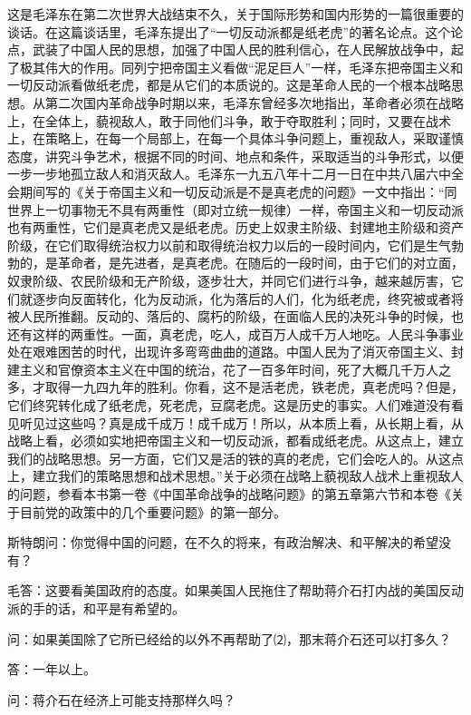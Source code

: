 \documentclass[UTF-8, a5paper, 12pt]{ctexart}
\begin{document}
这是毛泽东在第二次世界大战结束不久，关于国际形势和国内形势的一篇很重要的谈话。在这篇谈话里，毛泽东提出了“一切反动派都是纸老虎”的著名论点。这个论点，武装了中国人民的思想，加强了中国人民的胜利信心，在人民解放战争中，起了极其伟大的作用。同列宁把帝国主义看做“泥足巨人”一样，毛泽东把帝国主义和一切反动派看做纸老虎，都是从它们的本质说的。这是革命人民的一个根本战略思想。从第二次国内革命战争时期以来，毛泽东曾经多次地指出，革命者必须在战略上，在全体上，藐视敌人，敢于同他们斗争，敢于夺取胜利；同时，又要在战术上，在策略上，在每一个局部上，在每一个具体斗争问题上，重视敌人，采取谨慎态度，讲究斗争艺术，根据不同的时间、地点和条件，采取适当的斗争形式，以便一步一步地孤立敌人和消灭敌人。毛泽东一九五八年十二月一日在中共八届六中全会期间写的《关于帝国主义和一切反动派是不是真老虎的问题》一文中指出：“同世界上一切事物无不具有两重性（即对立统一规律）一样，帝国主义和一切反动派也有两重性，它们是真老虎又是纸老虎。历史上奴隶主阶级、封建地主阶级和资产阶级，在它们取得统治权力以前和取得统治权力以后的一段时间内，它们是生气勃勃的，是革命者，是先进者，是真老虎。在随后的一段时间，由于它们的对立面，奴隶阶级、农民阶级和无产阶级，逐步壮大，并同它们进行斗争，越来越厉害，它们就逐步向反面转化，化为反动派，化为落后的人们，化为纸老虎，终究被或者将被人民所推翻。反动的、落后的、腐朽的阶级，在面临人民的决死斗争的时候，也还有这样的两重性。一面，真老虎，吃人，成百万人成千万人地吃。人民斗争事业处在艰难困苦的时代，出现许多弯弯曲曲的道路。中国人民为了消灭帝国主义、封建主义和官僚资本主义在中国的统治，花了一百多年时间，死了大概几千万人之多，才取得一九四九年的胜利。你看，这不是活老虎，铁老虎，真老虎吗？但是，它们终究转化成了纸老虎，死老虎，豆腐老虎。这是历史的事实。人们难道没有看见听见过这些吗？真是成千成万！成千成万！所以，从本质上看，从长期上看，从战略上看，必须如实地把帝国主义和一切反动派，都看成纸老虎。从这点上，建立我们的战略思想。另一方面，它们又是活的铁的真的老虎，它们会吃人的。从这点上，建立我们的策略思想和战术思想。”关于必须在战略上藐视敌人战术上重视敌人的问题，参看本书第一卷《中国革命战争的战略问题》的第五章第六节和本卷《关于目前党的政策中的几个重要问题》的第一部分。

斯特朗问：你觉得中国的问题，在不久的将来，有政治解决、和平解决的希望没有？

毛答：这要看美国政府的态度。如果美国人民拖住了帮助蒋介石打内战的美国反动派的手的话，和平是有希望的。

问：如果美国除了它所已经给的以外不再帮助了⑵，那末蒋介石还可以打多久？

答：一年以上。

问：蒋介石在经济上可能支持那样久吗？
\end{document}
